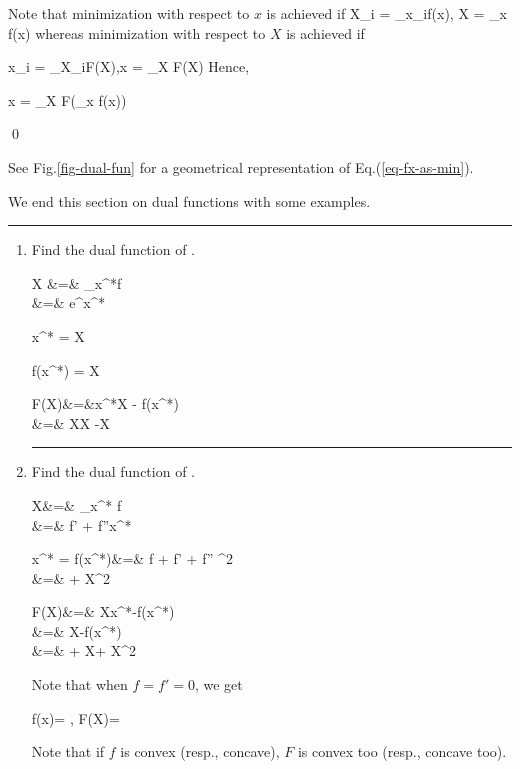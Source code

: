 Note that minimization
with respect to $x$
is achieved if
\beq
X_i = \partial_{x_i}f(x),\;
X = \nabla_x f(x)
\eeq
whereas minimization 
with respect to $X$
is achieved if 

\beq
x_i = \partial_{X_i}F(X),\;x = \nabla_X F(X)
\eeq
Hence,

\beq
x = \nabla_X F(\nabla_x f(x))
\eeq

\qed

See Fig.\ref{fig-dual-fun}
for a geometrical
representation
of Eq.(\ref{eq-fx-as-min}).

We end this section
on dual functions with some
examples.

\hrule
\begin{enumerate}
\item
Find the dual function of
\beq
{}
\;.
\eeq

\beqa
X &=& \partial_{x^*}f
\\
&=&
e^{x^*}
\eeqa

\beq
x^* = \ln  X
\eeq

\beq
f(x^*) = X
\eeq

\beqa
F(X)&=&x^*X - f(x^*)
\\
&=&
X\ln X -X
\eeqa



\hrule
\item 
Find the dual function of
\beq
{}
\;.
\eeq

\beqa
X&=&
\partial_{x^*} f
\\
&=&
f' + f''x^*
\label{eq-X-xstar}
\eeqa

\beq
x^* = 
\eeq
\beqa
f(x^*)&=& f
+
f' 
+
f''
^2
\\
&=&
+
X^2
\eeqa

\beqa
F(X)&=&
Xx^*-f(x^*)
\\
&=&
X
-f(x^*)
\\
&=&
+
X
+
X^2
\eeqa

Note that when $f=f'=0$,
we get 

\beq
f(x)= 
,\quad 
F(X)= 
\eeq

Note that if $f$ is convex
(resp., concave), $F$
is convex too (resp., concave too).

%
%
%
%


\end{enumerate}
